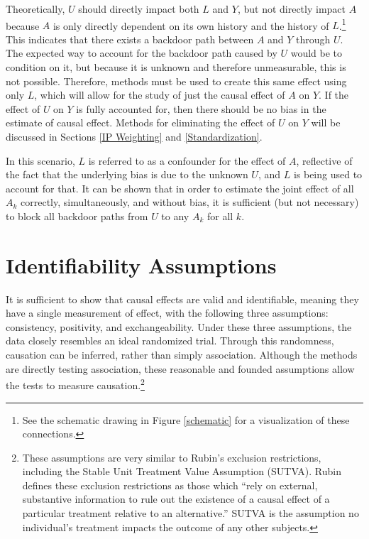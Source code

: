 Theoretically, $U$ should directly impact both $L$ and $Y$, but not directly impact $A$ because $A$ is only directly dependent on its own history and the history of $L$.\footnote{See the schematic drawing in Figure \ref{schematic} for a visualization of these connections.}  This indicates that there exists a backdoor path between $A$ and $Y$ through $U$.\cite{wright2015international}  The expected way to account for the backdoor path caused by $U$ would be to condition on it, but because it is unknown and therefore unmeasurable, this is not possible.  Therefore, methods must be used to create this same effect using only $L$, which will allow for the study of just the causal effect of $A$ on $Y$.  If the effect of $U$ on $Y$ is fully accounted for, then there should be no bias in the estimate of causal effect.  Methods for eliminating the effect of $U$ on $Y$ will be discussed in Sections \ref{IP Weighting} and \ref{Standardization}.  

In this scenario, $L$ is referred to as a confounder for the effect of $A$, reflective of the fact that the underlying bias is due to the unknown $U$, and $L$ is being used to account for that.  It can be shown that in order to estimate the joint effect of all $A_k$ correctly, simultaneously, and without bias, it is sufficient (but not necessary) to block all backdoor paths from $U$ to any $A_k$ for all $k$.\cite{pearl1995probabilistic}

\section{Identifiability Assumptions} \label{assumptions} 
It is sufficient to show that causal effects are valid and identifiable, meaning they have a single measurement of effect, with the following three assumptions: consistency, positivity, and exchangeability.\cite{cole2009consistency, hernan_robins_2016}   Under these three assumptions, the data closely resembles an ideal randomized trial.  Through this randomness, causation can be inferred, rather than simply association.  Although the methods are directly testing association, these reasonable and founded assumptions allow the tests to measure causation.\footnote{These assumptions are very similar to Rubin's exclusion restrictions, including the Stable Unit Treatment Value Assumption (SUTVA).\cite{rubin1980randomization}  Rubin defines these exclusion restrictions as those which ``rely on external, substantive information to rule out the existence of a causal effect of a particular treatment relative to an alternative.''\cite{imbens2015causal} SUTVA is the assumption no individual's treatment impacts the outcome of any other subjects.}

